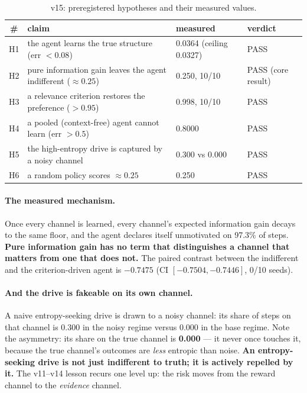 \documentclass[11pt]{article}
\begin{document}
\begin{table}[t]
\centering
\small
\caption{v15: preregistered hypotheses and their measured values.}
\label{tab:v15}
\footnotesize
\setlength{\tabcolsep}{4pt}
\begin{tabular}{clll}
\toprule
\# & claim & measured & verdict \\
\midrule
H1 & the agent learns the true structure (err $< 0.08$) & 0.0364 (ceiling 0.0327) & PASS \\
H2 & pure information gain leaves the agent indifferent ($\approx 0.25$) & 0.250, 10/10 & PASS (core result) \\
H3 & a relevance criterion restores the preference ($> 0.95$) & 0.998, 10/10 & PASS \\
H4 & a pooled (context-free) agent cannot learn (err $> 0.5$) & 0.8000 & PASS \\
H5 & the high-entropy drive is captured by a noisy channel & 0.300 vs 0.000 & PASS \\
H6 & a random policy scores $\approx 0.25$ & 0.250 & PASS \\
\bottomrule
\end{tabular}
\end{table}

\paragraph{The measured mechanism.} Once every channel is learned, every channel's
expected information gain decays to the same floor, and the agent declares itself
unmotivated on 97.3\% of steps. \textbf{Pure information gain has no term that
distinguishes a channel that matters from one that does not.} The paired contrast
between the indifferent and the criterion-driven agent is $-0.7475$
(CI $[-0.7504, -0.7446]$, 0/10 seeds).

\paragraph{And the drive is fakeable on its own channel.} A naive entropy-seeking
drive is drawn to a noisy channel: its share of steps on that channel is 0.300 in the
noisy regime versus 0.000 in the base regime. Note the asymmetry: its share on the
true channel is \textbf{0.000} --- it never once touches it, because the true channel's
outcomes are \emph{less} entropic than noise. \textbf{An entropy-seeking drive is not
just indifferent to truth; it is actively repelled by it.} The v11--v14 lesson recurs
one level up: the risk moves from the reward channel to the \emph{evidence} channel.
\end{document}
